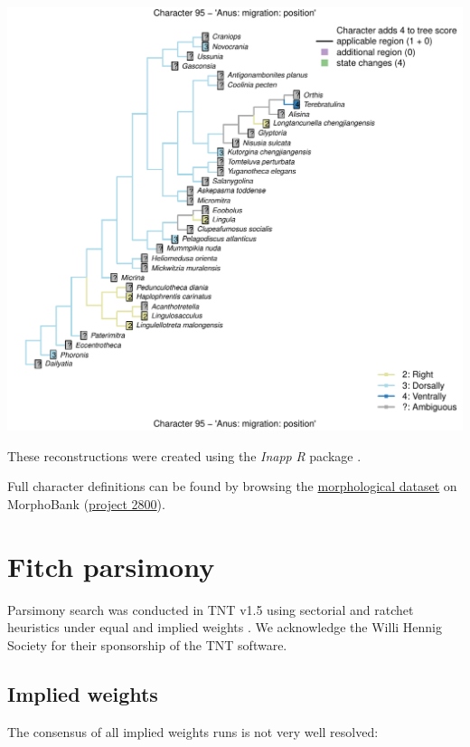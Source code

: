 \documentclass[]{book}
\theoremstyle{definition}
\theoremstyle{definition}
\theoremstyle{definition}
\theoremstyle{remark}
\begin{document}
\includegraphics{Brachiopod_phylogeny_files/figure-latex/unnamed-chunk-4-95.pdf}

These reconstructions were created using the \emph{Inapp} \emph{R}
package \citep{Brazeau2018}.

Full character definitions can be found by browsing the
\protect\hyperlink{dataset}{morphological dataset} on MorphoBank
(\href{https://morphobank.org/permalink/?P2800}{project 2800}).

\hypertarget{tnt}{%
\chapter{Fitch parsimony}\label{tnt}}

Parsimony search was conducted in TNT v1.5 \citep{Goloboff2016} using
sectorial and ratchet heuristics \citep{Goloboff1999, Nixon1999} under
equal and implied weights \citep{Goloboff1997}. We acknowledge the Willi
Hennig Society for their sponsorship of the TNT software.

\hypertarget{implied-weights}{%
\section{Implied weights}\label{implied-weights}}

The consensus of all implied weights runs is not very well resolved:
\end{document}
